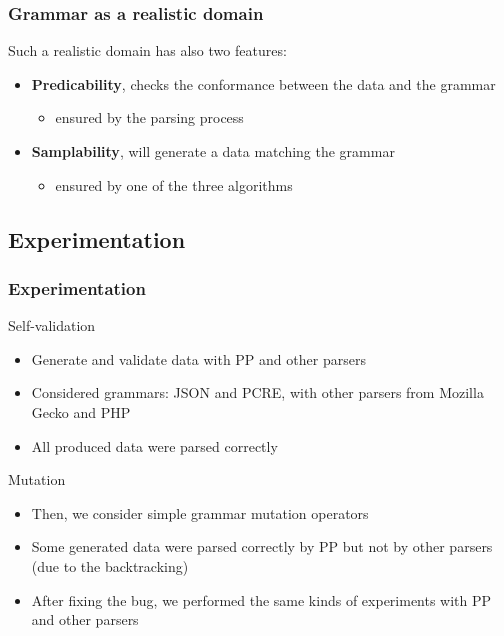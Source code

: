 \documentclass[9pt]{beamer}
\begin{document}
\begin{frame}
\frametitle{Grammar as a realistic domain}

Such a realistic domain has also two features:
\begin{itemize}
\item[\checked] \textbf{Predicability}, checks the conformance between the
data and the grammar
  \begin{itemize}
  \item ensured by the parsing process
  \end{itemize}
\item[\checked] \textbf{Samplability}, will generate a data matching the grammar
  \begin{itemize}
  \item ensured by one of the three algorithms
  \end{itemize}
\end{itemize}

\end{frame}

\subsection{Experimentation}

\begin{frame}
\frametitle{Experimentation}

\begin{block}{Self-validation}
\begin{itemize}
\item Generate and validate data with PP and other parsers
\item Considered grammars: JSON and PCRE, with other parsers from Mozilla Gecko
and PHP
\item All produced data were parsed correctly
\end{itemize}
\end{block}

\begin{block}{Mutation}
\begin{itemize}
\item Then, we consider simple grammar mutation operators
\item Some generated data were parsed correctly by PP but not by
other parsers (due to the backtracking)
\item After fixing the bug, we performed the same kinds of experiments with PP
and other parsers
\end{itemize}
\end{block}

\end{frame}
\end{document}
